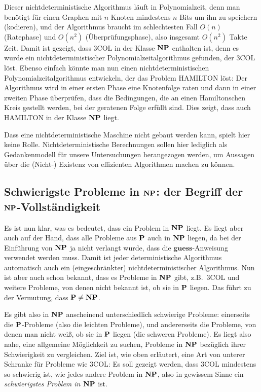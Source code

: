 Dieser nichtdeterministische Algorithmus läuft in Polynomialzeit, denn
man benötigt für einen Graphen mit $n$ Knoten mindestens $n$ Bits um
ihn zu speichern (kodieren), und der Algorithmus braucht im
schlechtesten Fall $O(n)$ (Ratephase) und $O(n^2)$
(Überprüfungsphase), also insgesamt $O(n^2)$ Takte Zeit.  Damit ist
gezeigt, dass $3\mathrm{COL}$ in der Klasse $\NP$ enthalten ist, denn
es wurde ein nichtdeterministischer Polynomialzeitalgorithmus
gefunden, der $3\mathrm{COL}$ löst. Ebenso einfach könnte man nun
einen nichtdeterministischen Polynomialzeitalgorithmus entwickeln, der
das Problem \textsf{HAMILTON} löst: Der Algorithmus wird in einer
ersten Phase eine Knotenfolge raten und dann in einer zweiten Phase
überprüfen, dass die Bedingungen, die an einen Hamiltonschen Kreis
gestellt werden, bei der geratenen Folge erfüllt sind. Dies zeigt,
dass auch \textsf{HAMILTON} in der Klasse $\NP$ liegt.

Dass eine nichtdeterministische Maschine nicht gebaut werden kann,
spielt hier keine Rolle. Nichtdeterministische Berechnungen sollen
hier lediglich als Gedankenmodell für unsere Untersuchungen
herangezogen werden, um Aussagen über die (Nicht-) Existenz von
effizienten Algorithmen machen zu können.

\subsection{Schwierigste Probleme in $\NP$: der Begriff der 
$\NP$-Vollständigkeit}

Es ist nun klar, was es bedeutet, dass ein Problem in $\NP$ liegt. Es
liegt aber auch auf der Hand, dass alle Probleme aus $\P$ auch in
$\NP$ liegen, da bei der Einführung von $\NP$ ja nicht verlangt wurde,
dass die $\mathbf{guess}$-Anweisung verwendet werden muss. Damit ist
jeder deterministische Algorithmus automatisch auch ein
(eingeschränkter) nichtdeterministischer Algorithmus. Nun ist aber
auch schon bekannt, dass es Probleme in $\NP$ gibt, z.B.~$3\mathrm{COL}$ und
weitere Probleme, von denen nicht bekannt ist, ob sie in $\P$
liegen. Das führt zu der Vermutung, dass $\P\neq\NP$.

Es gibt also in $\NP$ anscheinend unterschiedlich schwierige Probleme:
einerseits die $\P$-Probleme (also die leichten Probleme), und
andererseits die Probleme, von denen man nicht weiß, ob sie in $\P$
liegen (die schweren Probleme).  Es liegt also nahe, eine allgemeine
Möglichkeit zu suchen, Probleme in $\NP$ bezüglich ihrer Schwierigkeit
zu vergleichen. Ziel ist, wie oben erläutert, eine Art von unterer
Schranke für Probleme wie $3\mathrm{COL}$: Es soll gezeigt werden,
dass $3\mathrm{COL}$ mindestens so schwierig ist, wie jedes andere
Problem in $\NP$, also in gewissem Sinne ein \emph{schwierigstes
Problem in $\NP$} ist.

